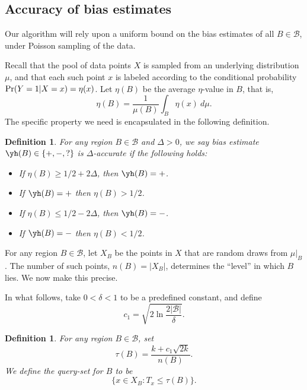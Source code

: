 \documentclass{article}
\def\pr{{\rm Pr}}
\def\B{{\mathcal B}}
\newtheorem{defn}[thm]{Definition}
\begin{document}
\subsection{Accuracy of bias estimates}

Our algorithm will rely upon a uniform bound on the bias estimates of all $B \in \B$, under Poisson sampling of the data. 

Recall that the pool of data points $X$ is sampled from an underlying distribution $\mu$, and that each such point $x$ is labeled according to the conditional probability $\pr(Y = 1|X = x) = \eta(x)$. Let $\eta(B)$ be the average $\eta$-value in $B$, that is,
$$ \eta(B) = \frac{1}{\mu(B)} \int_B \eta(x) \ d\mu .$$
The specific property we need is encapsulated in the following definition.
\begin{defn}
For any region $B \in \B$ and $\Delta > 0$, we say bias estimate $\yh(B) \in \{+,-,?\}$ is {\it $\Delta$-accurate} if the following holds:
\begin{itemize}
\item If $\eta(B) \geq 1/2 + 2 \Delta$, then $\yh(B) = +$.
\item If $\yh(B) = +$ then $\eta(B) > 1/2$.
\item If $\eta(B) \leq 1/2 - 2 \Delta$, then $\yh(B) = -$.
\item If $\yh(B) = -$ then $\eta(B) < 1/2$.
\end{itemize}
\label{def:accurate-bias-estimate}
\end{defn}

For any region $B \in \B$, let $X_B$ be the points in $X$ that are random draws from $\mu|_B$. The number of such points, $n(B) = |X_B|$, determines the ``level'' in which $B$ lies. We now make this precise.

In what follows, take $0 < \delta < 1$ to be a predefined constant, and define
\begin{equation}
c_1 = \sqrt{2 \ln \frac{2|\B|}{\delta}} .
\label{eq:c1}
\end{equation}

\begin{defn}
For any region $B \in \B$, set 
\begin{equation}
\tau(B) = \frac{k + c_1 \sqrt{2k}}{n(B)} .
\label{eq:ball-threshold}
\end{equation}
We define the {\it query-set} for $B$ to be 
$$ \{x \in X_B: T_x \leq \tau(B)\}.$$
\label{def:query-set}
\end{defn}
\end{document}
